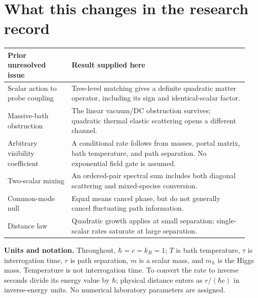 \documentclass[11pt]{article}
\begin{document}
\section*{What this changes in the research record}
\begin{tabular}{@{}p{0.25\linewidth}p{0.69\linewidth}@{}}
\toprule
Prior unresolved issue & Result supplied here \\
\midrule
Scalar action to probe coupling & Tree-level matching gives a definite quadratic matter operator, including its sign and identical-scalar factor. \\
Massive-bath obstruction & The linear vacuum/DC obstruction survives; quadratic thermal elastic scattering opens a different channel. \\
Arbitrary visibility coefficient & A conditional rate follows from masses, portal matrix, bath temperature, and path separation. No exponential field gate is assumed. \\
Two-scalar mixing & An ordered-pair spectral sum includes both diagonal scattering and mixed-species conversion. \\
Common-mode null & Equal means cancel phase, but do not generally cancel fluctuating path information. \\
Distance law & Quadratic growth applies at small separation; single-scalar rates saturate at large separation. \\
\bottomrule
\end{tabular}

\textbf{Units and notation.} Throughout, $\hbar=c=k_B=1$;
$T$ is bath temperature, $\tau$ is interrogation time, $r$ is path separation,
$m$ is a scalar mass, and $m_h$ is the Higgs mass. Temperature is not
interrogation time. To convert the rate to inverse seconds divide its energy
value by $\hbar$; physical distance enters as $r/(\hbar c)$ in inverse-energy units.
No numerical laboratory parameters are assigned.

\newpage
\end{document}
